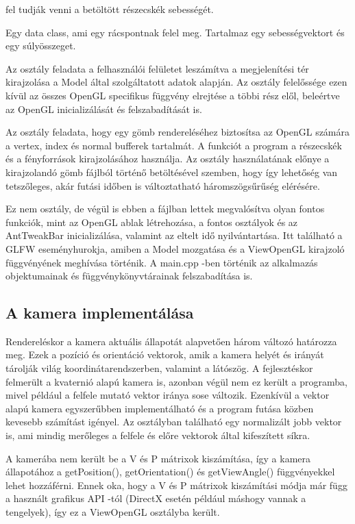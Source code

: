 \begin{description}[font=\normalfont\itshape\space]
fel tudják venni a betöltött részecskék sebességét.
\item[ArrayElement:] 
Egy data class, 
ami egy rácspontnak felel meg. 
Tartalmaz egy sebességvektort és egy súlyösszeget. 
\item[ViewOpenGL:] Az osztály feladata a felhasználói felületet leszámítva 
a megjelenítési tér kirajzolása a Model által szolgáltatott adatok alapján. 
Az osztály felelőssége ezen kívül 
az összes OpenGL specifikus függvény elrejtése a többi rész elől, 
beleértve az OpenGL inicializálását és felszabadítását is.
\item[Sphere:] 
Az osztály feladata, 
hogy egy gömb rendereléséhez biztosítsa az OpenGL számára a vertex, 
index és normal bufferek tartalmát. 
A funkciót a program a részecskék és 
a fényforrások kirajzolásához használja. 
Az osztály használatának előnye a kirajzolandó gömb 
fájlból történő betöltésével szemben, 
hogy így lehetőség van tetszőleges, 
akár futási időben is változtatható háromszögsűrűség elérésére.
\item[main.cpp:] 
Ez nem osztály, 
de végül is ebben a fájlban lettek megvalósítva olyan fontos funkciók, 
mint az OpenGL ablak létrehozása, a fontos osztályok 
és az AntTweakBar inicializálása, 
valamint az eltelt idő nyilvántartása. 
Itt található a GLFW eseményhurokja, 
amiben a Model mozgatása és a ViewOpenGL kirajzoló függvényének meghívása történik. 
A {\ttfamily main.cpp} -ben történik
az alkalmazás objektumainak és függvénykönyvtárainak 
felszabadítása is.
\end{description}

\subsection{A kamera implementálása}

Rendereléskor a kamera aktuális állapotát alapvetően három változó határozza meg. 
Ezek a pozíció és orientáció vektorok, 
amik a kamera helyét és irányát tárolják világ koordinátarendszerben, 
valamint a látószög. 
A fejlesztéskor felmerült a kvaternió alapú kamera is, 
azonban végül nem ez került a programba, 
mivel például a felfele mutató vektor iránya sose változik. 
Ezenkívül a vektor alapú kamera egyszerűbben implementálható 
és a program futása közben kevesebb számítást igényel. 
Az osztályban található egy normalizált jobb vektor is, 
ami mindig merőleges 
a felfele és előre vektorok által kifeszített síkra. 

A kamerába nem került be a V és P mátrixok kiszámítása, 
így a kamera állapotához a {\ttfamily getPosition()}, 
{\ttfamily getOrientation()} és 
{\ttfamily getViewAngle()} függvényekkel lehet hozzáférni. 
Ennek oka, 
hogy a V és P mátrixok kiszámítási módja már függ a használt 
grafikus API -tól (DirectX esetén például máshogy vannak a tengelyek), 
így ez a {\ttfamily ViewOpenGL} osztályba került.

